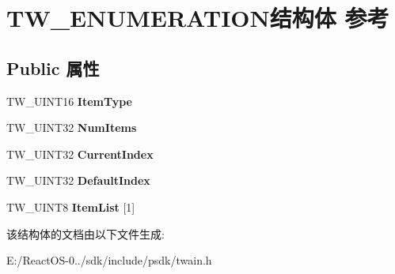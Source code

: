 \hypertarget{struct_t_w___e_n_u_m_e_r_a_t_i_o_n}{}\section{T\+W\+\_\+\+E\+N\+U\+M\+E\+R\+A\+T\+I\+O\+N结构体 参考}
\label{struct_t_w___e_n_u_m_e_r_a_t_i_o_n}
\subsection*{Public 属性}
\begin{DoxyCompactItemize}
\item 
\mbox{\label{struct_t_w___e_n_u_m_e_r_a_t_i_o_n_a86939ee49029f8c310c33baf75921da6}} 
T\+W\+\_\+\+U\+I\+N\+T16 {\bfseries Item\+Type}
\item 
\mbox{\label{struct_t_w___e_n_u_m_e_r_a_t_i_o_n_a28dd6ac364dc711f7debf52541cb7084}} 
T\+W\+\_\+\+U\+I\+N\+T32 {\bfseries Num\+Items}
\item 
\mbox{\label{struct_t_w___e_n_u_m_e_r_a_t_i_o_n_a4edc4acf23c9d56bd34a438580714c0e}} 
T\+W\+\_\+\+U\+I\+N\+T32 {\bfseries Current\+Index}
\item 
\mbox{\label{struct_t_w___e_n_u_m_e_r_a_t_i_o_n_a13ad91cfbeee47937476b9fce71bf280}} 
T\+W\+\_\+\+U\+I\+N\+T32 {\bfseries Default\+Index}
\item 
\mbox{\label{struct_t_w___e_n_u_m_e_r_a_t_i_o_n_a7f496e38c45b7998b27e8cfb6f65e1d9}} 
T\+W\+\_\+\+U\+I\+N\+T8 {\bfseries Item\+List} \mbox{[}1\mbox{]}
\end{DoxyCompactItemize}


该结构体的文档由以下文件生成\+:\begin{DoxyCompactItemize}
\item 
E\+:/\+React\+O\+S-\/0../sdk/include/psdk/twain.\+h\end{DoxyCompactItemize}
